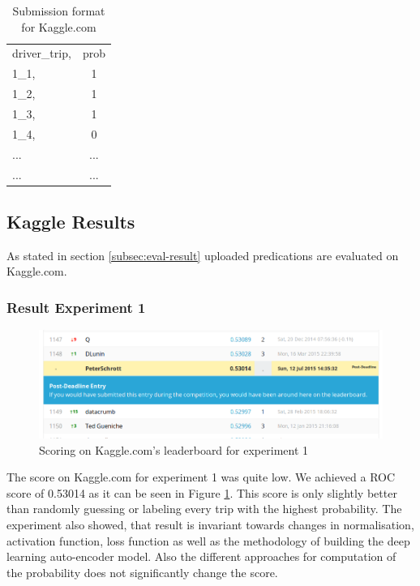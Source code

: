 \documentclass{vldb}
\begin{document}
\begin{table}
\centering
\begin{tabular}{l c}
driver\_trip, & prob\\
1\_1,& 1\\
1\_2,& 1\\
1\_3,& 1\\
1\_4,& 0\\
... & ... \\
... & ... \\
\end{tabular}
\caption{Submission format for Kaggle.com}
\label{table:kaggle-submission}
\end{table}


\subsection{Kaggle Results}

As stated in section \ref{subsec:eval-result} uploaded predications are evaluated on Kaggle.com. 


\subsubsection*{Result Experiment 1}
\label{ssubsec:Res-e1}

\begin{figure}
\centering
\includegraphics[width=\linewidth]{"pics/kaggle-result-1"}
\caption{Scoring on Kaggle.com's leaderboard for experiment 1}
\label{fig:kaggle-result1}
\end{figure}

The score on Kaggle.com for experiment 1 was quite low. We achieved a ROC score of 0.53014 as it can be seen in Figure \ref{fig:kaggle-result1}. This score is only slightly better than randomly guessing or labeling every trip with the highest probability. The experiment also showed, that result is invariant towards changes in normalisation, activation function, loss function as well as the methodology of building the deep learning auto-encoder model. Also the different approaches for computation of the probability does not significantly change the score.
\end{document}
